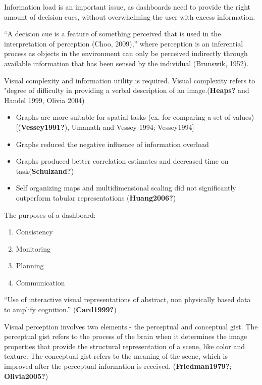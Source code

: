 \documentclass[print]{nuthesis}
\providecommand{\tightlist}{%
  \setlength{\itemsep}{0pt}\setlength{\parskip}{0pt}}
\begin{document}
Information load is an important issue, as dashboards need to provide the right amount of decision cues, without overwhelming the user with excess information.

``A decision cue is a feature of something perceived that is used in the interpretation of perception (Choo, 2009),'' where perception is an inferential process as objects in the environment can only be perceived indirectly through available information that has been sensed by the individual (Brunswik, 1952).

Visual complexity and information utility is required. Visual complexity refers to "degree of difficulty in providing a verbal description of an image.(\textbf{Heaps?} and Handel 1999, Olivia 2004)

\begin{itemize}
\tightlist
\item
  Graphs are more suitable for spatial tasks (ex. for comparing a set of values) {[}(\textbf{Vessey1991?}), Umanath and Vessey 1994; Vessey1994{]}
\item
  Graphs reduced the negative influence of information overload
\item
  Graphs produced better correlation estimates and decreased time on task(\textbf{Schulzand?})
\item
  Self organizing maps and multidimensional scaling did not significantly outperform tabular representations (\textbf{Huang2006?})
\end{itemize}

The purposes of a dashboard:

\begin{enumerate}
\def\labelenumi{\arabic{enumi}.}
\tightlist
\item
  Consistency
\item
  Monitoring
\item
  Planning
\item
  Communication
\end{enumerate}

``Use of interactive visual representations of abstract, non physically based data to amplify cognition.'' (\textbf{Card1999?})

Visual perception involves two elements - the perceptual and conceptual gist. The perceptual gist refers to the process of the brain when it determines the image properties that provide the structural representation of a scene, like color and texture. The conceptual gist refers to the meaning of the scene, which is improved after the perceptual information is received. (\textbf{Friedman1979?}; \textbf{Olivia2005?})
\end{document}
